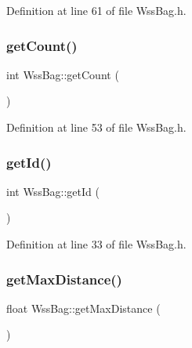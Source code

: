Definition at line 61 of file Wss\+Bag.\+h.

\mbox{\label{class_wss_bag_a8f0597beadf6a65bac27b59d775eabbb}} 
\subsubsection{\texorpdfstring{get\+Count()}{getCount()}}
{\footnotesize\ttfamily int Wss\+Bag\+::get\+Count (\begin{DoxyParamCaption}{ }\end{DoxyParamCaption})\hspace{0.3cm}{\ttfamily [inline]}}



Definition at line 53 of file Wss\+Bag.\+h.

\mbox{\label{class_wss_bag_ac82edcabdc9453934746a78f06cd5532}} 
\subsubsection{\texorpdfstring{get\+Id()}{getId()}}
{\footnotesize\ttfamily int Wss\+Bag\+::get\+Id (\begin{DoxyParamCaption}{ }\end{DoxyParamCaption})\hspace{0.3cm}{\ttfamily [inline]}}



Definition at line 33 of file Wss\+Bag.\+h.

\mbox{\label{class_wss_bag_ae6544449a24ffde79a2680d98c1e1d52}} 
\subsubsection{\texorpdfstring{get\+Max\+Distance()}{getMaxDistance()}}
{\footnotesize\ttfamily float Wss\+Bag\+::get\+Max\+Distance (\begin{DoxyParamCaption}{ }\end{DoxyParamCaption})\hspace{0.3cm}{\ttfamily [inline]}}



